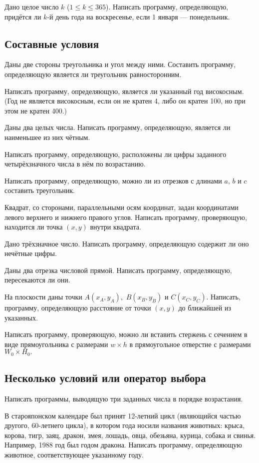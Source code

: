 \task Дано целое число $k$ ($1 \leqslant k \leqslant 365$). Написать
программу, определяющую, придётся ли $k$-й день года на воскресенье,
если 1 января — понедельник.

\subsection{Составные условия} 

\task Даны две стороны треугольника и угол между ними. Составить
программу, определяющую является ли треугольник равносторонним.

\task Написать программу, определяющую, является ли указанный год
високосным. (Год не является високосным, если он не кратен 4, либо он
кратен 100, но при этом не кратен 400.)

\task Даны два целых числа. Написать программу, определяющую, является
ли наименьшее из них чётным.

\task Написать программу, определяющую, расположены ли цифры заданного
четырёхзначного числа в нём по возрастанию.

\task Написать программу, определяющую, можно ли из отрезков с длинами
$a$, $b$ и $c$ составить треугольник.

\task Квадрат, со сторонами, параллельными осям координат, задан
координатами левого верхнего и нижнего правого углов. Написать
программу, проверяющую, находится ли точка $(x, y)$ внутри квадрата.

\task Дано трёхзначное число. Написать программу, определяющую
содержит ли оно нечётные цифры.

\task Даны два отрезка числовой прямой. Написать программу,
определяющую, пересекаются ли они.

\task На плоскости даны точки $A(x_A, y_A),$ $B(x_B, y_B)$ и $C(x_C,
y_C)$. Написать, программу, определяющую расстояние от точки $(x, y)$
до ближайшей из указанных.

\task Написать программу, проверяющую, можно ли вставить стержень с
сечением в виде прямоугольника с размерами $w×h$ в прямоугольное
отверстие с размерами $W_0×H_0.$

\subsection{Несколько условий или оператор выбора}

\task Написать программы, выводящую три заданных числа в порядке
возрастания.

\task В старояпонском календаре был принят 12-летний цикл (являющийся
частью другого, 60-летнего цикла), в котором года носили названия
животных: крыса, корова, тигр, заяц, дракон, змея, лошадь, овца,
обезьяна, курица, собака и свинья. Например, 1988 год был годом
дракона. Написать программу, определяющую животное, соответствующее
указанному году.

